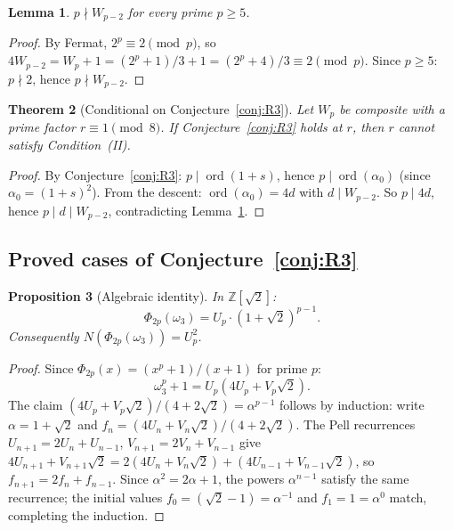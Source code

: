 \documentclass[12pt]{article}
\theoremstyle{plain}
\newtheorem{theorem}{Theorem}[section]
\newtheorem{lemma}[theorem]{Lemma}
\newtheorem{proposition}[theorem]{Proposition}
\theoremstyle{definition}
\theoremstyle{remark}
\begin{document}
\begin{lemma}\label{lem:p-nmid-Wp2}
\(p \nmid W_{p-2}\) for every prime \(p \geq 5\).
\end{lemma}


\begin{proof}
By Fermat, \(2^p \equiv 2 \pmod{p}\), so
\(4W_{p-2} = W_p + 1 = (2^p+1)/3 + 1 = (2^p+4)/3 \equiv 2 \pmod{p}\).
Since \(p \geq 5\): \(p \nmid 2\), hence \(p \nmid W_{p-2}\).\end{proof}


\begin{theorem}[Conditional on Conjecture~\ref{conj:R3}]\label{thm:R3-conditional}
Let \(W_p\) be composite with a prime factor
\(r \equiv 1 \pmod{8}\). If Conjecture~\ref{conj:R3} holds at \(r\),
then \(r\) cannot satisfy Condition~(II).
\end{theorem}


\begin{proof}
By Conjecture~\ref{conj:R3}: \(p \mid \operatorname{ord}(1+s)\), hence
\(p \mid \operatorname{ord}(\alpha_0)\) (since \(\alpha_0 = (1+s)^2\)).
From the descent: \(\operatorname{ord}(\alpha_0) = 4d\) with
\(d \mid W_{p-2}\). So \(p \mid 4d\), hence \(p \mid d \mid W_{p-2}\),
contradicting Lemma~\ref{lem:p-nmid-Wp2}.\end{proof}


\subsection{Proved cases of Conjecture~\ref{conj:R3}}


\begin{proposition}[Algebraic identity]\label{prop:algebraic-identity}
In \(\mathbb{Z}[\sqrt{2}]\):
\[
\Phi_{2p}(\omega_3) = U_p \cdot (1+\sqrt{2})^{p-1}.
\]
Consequently \(N(\Phi_{2p}(\omega_3)) = U_p^2\).
\end{proposition}


\begin{proof}
Since \(\Phi_{2p}(x) = (x^p + 1)/(x+1)\) for prime \(p\):
\[
\omega_3^p + 1 = U_p(4U_p + V_p\sqrt{2}).
\]
The claim \((4U_p + V_p\sqrt{2})/(4+2\sqrt{2}) = \alpha^{p-1}\)
follows by induction: write \(\alpha = 1+\sqrt{2}\) and
\(f_n = (4U_n + V_n\sqrt{2})/(4+2\sqrt{2})\). The
Pell recurrences \(U_{n+1} = 2U_n + U_{n-1}\),
\(V_{n+1} = 2V_n + V_{n-1}\) give
\(4U_{n+1} + V_{n+1}\sqrt{2}
= 2(4U_n + V_n\sqrt{2}) + (4U_{n-1}+V_{n-1}\sqrt{2})\),
so \(f_{n+1} = 2 f_n + f_{n-1}\). Since
\(\alpha^2 = 2\alpha + 1\), the powers \(\alpha^{n-1}\) satisfy
the same recurrence; the initial values
\(f_0 = (\sqrt{2}-1) = \alpha^{-1}\) and
\(f_1 = 1 = \alpha^0\) match, completing the induction.\end{proof}
\end{document}
